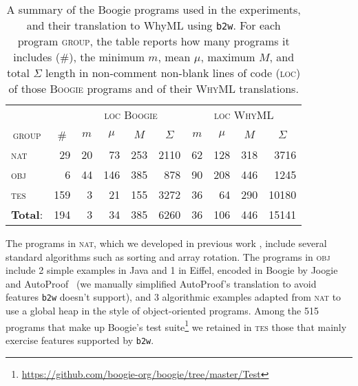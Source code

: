 \documentclass[a4paper,final]{llncs}
\newif\iflong
\newcommand{\nat}{\textsc{nat}\xspace} \newcommand{\tes}{\textsc{tes}\xspace} \newcommand{\obj}{\textsc{obj}\xspace}
\newcommand{\btw}{\texttt{b2w}\xspace}
\newcommand{\Boogie}{Boogie\xspace}
\newcommand{\WhyML}{WhyML\xspace}
\begin{document}
\begin{table}
\centering
\scriptsize
\setlength{\tabcolsep}{3pt}
\begin{tabular}{l r |*{1}{rrrr} |*{1}{rrrr}}
\multicolumn{1}{c}{} &
\multicolumn{1}{c}{} &
\multicolumn{4}{c}{\textsc{loc \Boogie}} &
\multicolumn{4}{c}{\textsc{loc \WhyML}}
\\
\multicolumn{1}{c}{\textsc{group}} &
\multicolumn{1}{c}{\textsc{\#}} &
\multicolumn{1}{c}{$m$} &
\multicolumn{1}{c}{$\mu$} &
\multicolumn{1}{c}{$M$} &
\multicolumn{1}{c}{$\Sigma$} &
\multicolumn{1}{c}{$m$} &
\multicolumn{1}{c}{$\mu$} &
\multicolumn{1}{c}{$M$} &
\multicolumn{1}{c}{$\Sigma$} 
\\
\hline
\nat  &  29  &  20  &  73  &  253  &  2110  &  62  &  128  &  318  &  3716
 \\
\obj  &  6  &  44  &  146  &  385  &  878  &  90  &  208  &  446  &  1245
 \\
\tes  &  159  &  3  &  21  &  155  &  3272  &  36  &  64  &  290  &  10180
 \\
\hline
\textbf{Total}:  &  194  &  3  &  34  &  385  &  6260  &  36  &  106  &  446  &  15141
 \\
 \end{tabular}
\caption{A summary of the \Boogie programs used in the experiments, and their translation to \WhyML using \btw. For each program \textsc{group}, the table reports how many programs it includes (\textsc{\#}), the minimum $m$, mean $\mu$, maximum $M$, and total $\Sigma$ length in non-comment non-blank lines of code (\textsc{loc}) of those \textsc{\Boogie} programs and of their \textsc{\WhyML} translations.}
\label{tab:programs-loc}
\end{table}



The programs in \nat, which we developed in previous work \cite{FMV-CSUR14,F14-TR-20062014}, include several standard algorithms such as sorting and array rotation.
The programs in \obj include 2 simple examples in Java and 1 in Eiffel, encoded in \Boogie by Joogie~\cite{ArltS12} and AutoProof~\cite{TFNP-TACAS15} (we manually simplified AutoProof's translation to avoid features \btw doesn't support), and 3 algorithmic examples adapted from \nat to use a global heap in the style of object-oriented programs.
Among the 515 programs that make up \Boogie's test suite\footnote{\url{https://github.com/boogie-org/boogie/tree/master/Test}} we retained in \tes those that mainly exercise features supported by \btw.
\iflong
This meant excluding several groups of tests that exercise special options (Houdini, assertion inference, special Z3 encodings and directives, etc.), unsupported language features (bitvectors, gotos, etc.), and the correctness of typechecking (\btw assumes well-formed \Boogie input).
It also meant excluding 4 programs that triggered \Boogie errors (a \Boogie \emph{error} means here a problem with the input such as a typechecking or parsing error due to a feature not activated; it is not a verification error, which just denotes a failed verification attempt and is fair game for evaluating the translation); and another 35 programs that \btw failed to translate because of unsupported features that we identified a posteriori.
\fi
\end{document}
